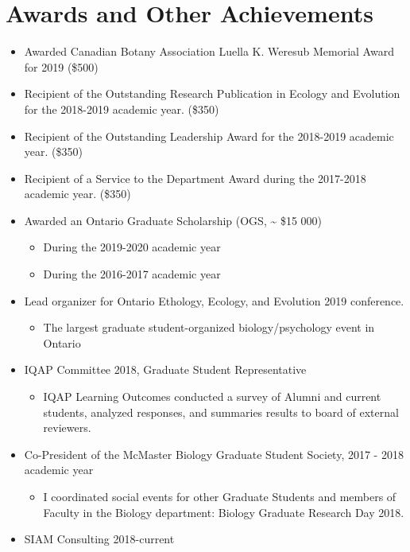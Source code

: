 \hypertarget{awards-and-other-achievements}{%
\section{Awards and Other
Achievements}\label{awards-and-other-achievements}}

\begin{itemize}
\tightlist
\item
  Awarded Canadian Botany Association Luella K. Weresub Memorial Award
  for 2019 (\$500)
\item
  Recipient of the Outstanding Research Publication in Ecology and
  Evolution for the 2018-2019 academic year. (\$350)
\item
  Recipient of the Outstanding Leadership Award for the 2018-2019
  academic year. (\$350)
\item
  Recipient of a Service to the Department Award during the 2017-2018
  academic year. (\$350)
\item
  Awarded an Ontario Graduate Scholarship (OGS, \textasciitilde{} \$15
  000)

  \begin{itemize}
  \tightlist
  \item
    During the 2019-2020 academic year
  \item
    During the 2016-2017 academic year
  \end{itemize}
\item
  Lead organizer for Ontario Ethology, Ecology, and Evolution 2019
  conference.

  \begin{itemize}
  \tightlist
  \item
    The largest graduate student-organized biology/psychology event in
    Ontario
  \end{itemize}
\item
  IQAP Committee 2018, Graduate Student Representative

  \begin{itemize}
  \tightlist
  \item
    IQAP Learning Outcomes conducted a survey of Alumni and current
    students, analyzed responses, and summaries results to board of
    external reviewers.
  \end{itemize}
\item
  Co-President of the McMaster Biology Graduate Student Society, 2017 -
  2018 academic year

  \begin{itemize}
  \tightlist
  \item
    I coordinated social events for other Graduate Students and members
    of Faculty in the Biology department: Biology Graduate Research Day
    2018.
  \end{itemize}
\item
  SIAM Consulting 2018-current


\end{itemize}
